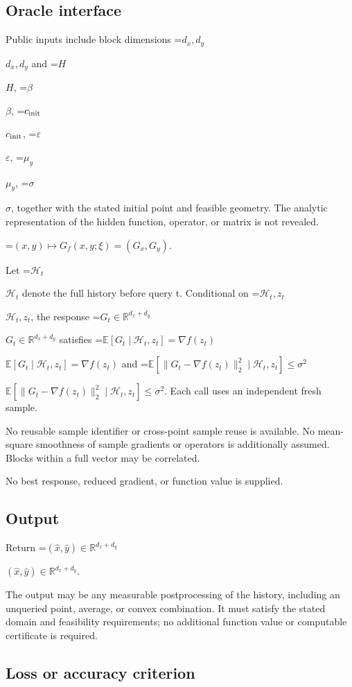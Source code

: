 \documentclass[10pt,a4paper]{article}
\newcommand{\AtlasMath}[1]{\par\begingroup\centering\setbox0=\hbox{$\displaystyle #1$}\ifdim\wd0>1.4\linewidth\typeout{ATLAS WIDE FORMULA: \the\wd0}\fi\ifdim\wd0>\linewidth\resizebox{\linewidth}{!}{\box0}\else\box0\fi\par\endgroup}
\newcommand{\AtlasInlineMath}[1]{\begingroup\setbox0=\hbox{$#1$}\ifdim\wd0>.4\linewidth\endgroup\AtlasMath{#1}\else\endgroup$#1$\fi}
\begin{document}
\subsection{Oracle interface}


Public inputs include block dimensions \AtlasInlineMath{d_x,d_y} and \AtlasInlineMath{H}, \AtlasInlineMath{\beta}, \AtlasInlineMath{c_{\rm init}}, \AtlasInlineMath{\varepsilon}, \AtlasInlineMath{\mu_y}, \AtlasInlineMath{\sigma}, together with the stated initial point and feasible geometry. The analytic representation of the hidden function, operator, or matrix is not revealed.




\AtlasMath{(x,y)\longmapsto G_f(x,y;\xi)=(G_x,G_y).}




Let \AtlasInlineMath{\mathcal H_t} denote the full history before query t. Conditional on \AtlasInlineMath{\mathcal H_t,z_t}, the response \AtlasInlineMath{G_t\in\mathbb R^{d_x+d_y}} satisfies \AtlasInlineMath{\mathbb E[G_t\mid\mathcal H_t,z_t]=\nabla f(z_t)} and \AtlasInlineMath{\mathbb E[\|G_t-\nabla f(z_t)\|_2^2\mid\mathcal H_t,z_t]\le\sigma^2}. Each call uses an independent fresh sample.



No reusable sample identifier or cross-point sample reuse is available. No mean-square smoothness of sample gradients or operators is additionally assumed. Blocks within a full vector may be correlated.



No best response, reduced gradient, or function value is supplied.



\subsection{Output}


Return \AtlasInlineMath{(\widehat{x},\widehat{y})\in\mathbb{R}^{d_x+d_y}}.



The output may be any measurable postprocessing of the history, including an unqueried point, average, or convex combination. It must satisfy the stated domain and feasibility requirements; no additional function value or computable certificate is required.



\subsection{Loss or accuracy criterion}
\end{document}
